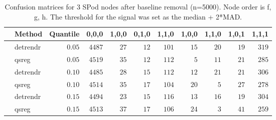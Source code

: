 \begin{table}[!tbp]
\caption{Confusion matrices for 3 SPod nodes after baseline 
      removal (n=5000). Node order is f, g, h. The threshold for the signal was 
      set as the median + 2*MAD.\label{confusion}} 
\begin{center}
\begin{tabular}{llrrrrrrrrr}
\hline\hline
\multicolumn{1}{l}{}&\multicolumn{1}{c}{Method}&\multicolumn{1}{c}{Quantile}&\multicolumn{1}{c}{0,0,0}&\multicolumn{1}{c}{1,0,0}&\multicolumn{1}{c}{0,1,0}&\multicolumn{1}{c}{1,1,0}&\multicolumn{1}{c}{1,0,0}&\multicolumn{1}{c}{1,1,0}&\multicolumn{1}{c}{1,0,1}&\multicolumn{1}{c}{1,1,1}\tabularnewline
\hline
&detrendr&$0.05$&$4487$&$27$&$12$&$101$&$15$&$20$&$19$&$319$\tabularnewline
&qsreg&$0.05$&$4519$&$35$&$12$&$112$&$ 5$&$11$&$21$&$285$\tabularnewline
&detrendr&$0.10$&$4485$&$28$&$15$&$112$&$12$&$21$&$21$&$306$\tabularnewline
&qsreg&$0.10$&$4514$&$35$&$17$&$104$&$20$&$ 5$&$27$&$278$\tabularnewline
&detrendr&$0.15$&$4494$&$23$&$15$&$116$&$13$&$16$&$19$&$304$\tabularnewline
&qsreg&$0.15$&$4513$&$37$&$17$&$106$&$24$&$ 3$&$41$&$259$\tabularnewline
\hline
\end{tabular}\end{center}
\end{table}
